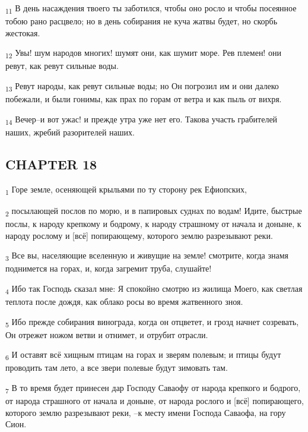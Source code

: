 \begin{tcolorbox}
\textsubscript{11} В день насаждения твоего ты заботился, чтобы оно росло и чтобы посеянное тобою рано расцвело; но в день собирания не куча жатвы будет, но скорбь жестокая.
\end{tcolorbox}
\begin{tcolorbox}
\textsubscript{12} Увы! шум народов многих! шумят они, как шумит море. Рев племен! они ревут, как ревут сильные воды.
\end{tcolorbox}
\begin{tcolorbox}
\textsubscript{13} Ревут народы, как ревут сильные воды; но Он погрозил им и они далеко побежали, и были гонимы, как прах по горам от ветра и как пыль от вихря.
\end{tcolorbox}
\begin{tcolorbox}
\textsubscript{14} Вечер--и вот ужас! и прежде утра уже нет его. Такова участь грабителей наших, жребий разорителей наших.
\end{tcolorbox}
\subsection{CHAPTER 18}
\begin{tcolorbox}
\textsubscript{1} Горе земле, осеняющей крыльями по ту сторону рек Ефиопских,
\end{tcolorbox}
\begin{tcolorbox}
\textsubscript{2} посылающей послов по морю, и в папировых суднах по водам! Идите, быстрые послы, к народу крепкому и бодрому, к народу страшному от начала и доныне, к народу рослому и [всё] попирающему, которого землю разрезывают реки.
\end{tcolorbox}
\begin{tcolorbox}
\textsubscript{3} Все вы, населяющие вселенную и живущие на земле! смотрите, когда знамя поднимется на горах, и, когда загремит труба, слушайте!
\end{tcolorbox}
\begin{tcolorbox}
\textsubscript{4} Ибо так Господь сказал мне: Я спокойно смотрю из жилища Моего, как светлая теплота после дождя, как облако росы во время жатвенного зноя.
\end{tcolorbox}
\begin{tcolorbox}
\textsubscript{5} Ибо прежде собирания винограда, когда он отцветет, и грозд начнет созревать, Он отрежет ножом ветви и отнимет, и отрубит отрасли.
\end{tcolorbox}
\begin{tcolorbox}
\textsubscript{6} И оставят всё хищным птицам на горах и зверям полевым; и птицы будут проводить там лето, а все звери полевые будут зимовать там.
\end{tcolorbox}
\begin{tcolorbox}
\textsubscript{7} В то время будет принесен дар Господу Саваофу от народа крепкого и бодрого, от народа страшного от начала и доныне, от народа рослого и [всё] попирающего, которого землю разрезывают реки, --к месту имени Господа Саваофа, на гору Сион.
\end{tcolorbox}
